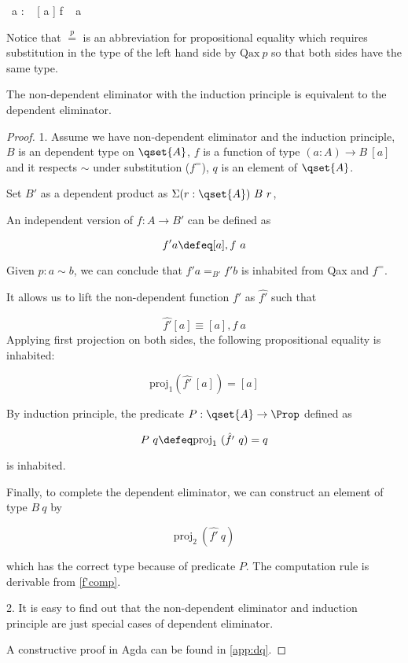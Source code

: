 {\Gamma \vdash {} ~a  :  ~ [ a ] \equiv f ~ a }


Notice that $\stackrel{p}{=}$ is an abbreviation for propositional equality which requires substitution in the type of the left hand side by $\text{Qax}~p$ so that both sides have the same type.

\begin{proposition}
The non-dependent eliminator with the induction principle is equivalent to the dependent eliminator.
\end{proposition}
\begin{proof}
1. Assume we have non-dependent eliminator and the induction principle, $B$ is an dependent type on $\qset{A}$, $f$ is a function of type $(a : A) \to B ~ [ a ]$ and it respects $\sim$ under substitution ($f^=$), $q$ is an element of $\qset{A}$.

Set $B'$ as a dependent product as $\Sigma (r : \qset{A}) ~B ~r$,

An independent version of $f : A \to B'$ can be defined as

$$f' a \defeq [ a ] , f ~a$$

Given $p : a \sim b$, we can conclude that $f' a =_{B'} f' b$ is inhabited from Qax and $f^=$.

It allows us to lift the non-dependent function $f'$ as $\hat{f'}$ such that 

\begin{equation}\label{f'comp}
\hat{f'} [ a ] \equiv [ a ] , f ~a
\end{equation}
Applying first projection on both sides, the following propositional equality is inhabited:

 $$\text{proj}_1 (\hat{f'} ~[ a ]) = [ a ]$$

By induction principle, the predicate $P : \qset{A} \to \Prop$ defined as

$$P ~ q \defeq \text{proj}_1 ~(\hat{f'} ~q) = q$$

is inhabited.

Finally, to complete the dependent eliminator, we can construct an element of type $B~q$ by

$$\text{proj}_2 ~(\hat{f'} ~q)$$

which has the correct type because of predicate $P$. The computation rule is derivable from \ref{f'comp}.

2. It is easy to find out that the non-dependent eliminator and induction principle are just special cases of dependent eliminator.

A constructive proof in Agda can be found in \autoref{app:dq}.
\end{proof}


